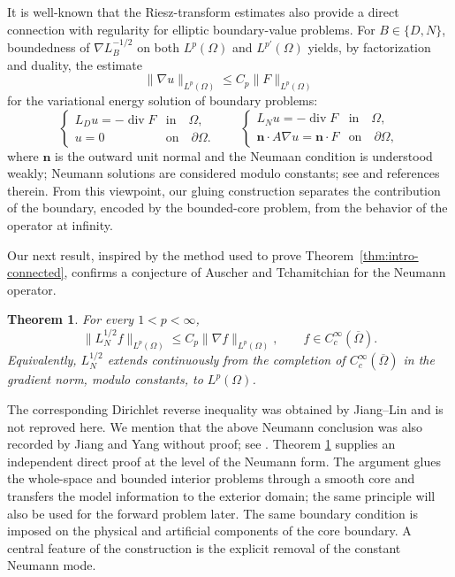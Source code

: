 \documentclass[12pt]{amsart}
\newcommand{\diver}{\operatorname{div}}
\newtheorem{theorem}{Theorem}[section]
\theoremstyle{remark}
\begin{document}
It is well-known that the Riesz-transform estimates also provide a direct connection with
regularity for elliptic boundary-value problems. For $B\in\{D,N\}$,
boundedness of $\nabla L_B^{-1/2}$ on both $L^p(\Omega)$ and
$L^{p'}(\Omega)$ yields, by factorization and duality, the estimate
\[
 \|\nabla u\|_{L^p(\Omega)}
 \leq C_p\|F\|_{L^p(\Omega)}
\]
for the variational energy solution of boundary problems:
\begin{equation*}
    \begin{cases}
        L_D u = - \diver F & \textrm{in} \quad \Omega,\\
        u = 0 & \textrm{on}\quad \partial \Omega.
    \end{cases} \qquad 
    \begin{cases}
        L_N u = - \diver F & \textrm{in} \quad \Omega,\\
        \mathbf n \cdot A \nabla u = \mathbf n \cdot F & \textrm{on}\quad \partial \Omega,
    \end{cases}
\end{equation*}
where $\mathbf n$ is the outward unit normal and the Neumaan condition
is understood weakly; Neumann solutions are considered modulo constants; see \cite{Byun05, Geng12} and references therein. From this viewpoint, our gluing construction separates the
contribution of the boundary, encoded by the bounded-core problem,
from the behavior of the operator at infinity.

Our next result, inspired by the method used to prove Theorem~\ref{thm:intro-connected}, confirms a conjecture of Auscher and Tchamitchian \cite[Remark 12]{AuscherTchamitchian01} for the Neumann operator.

\begin{theorem}
\label{thm:intro-neumann-reverse}
For every $1<p<\infty$,
\[
 \|L_N^{1/2}f\|_{L^p(\Omega)}
 \leq C_p\|\nabla f\|_{L^p(\Omega)},
 \qquad f\in C_c^\infty(\overline\Omega).
\]
Equivalently, $L_N^{1/2}$ extends continuously from the completion of
$C_c^\infty(\overline\Omega)$ in the gradient norm, modulo constants, to
$L^p(\Omega)$.
\end{theorem}

The corresponding Dirichlet reverse inequality was obtained by Jiang--Lin \cite[Theorem~1.3]{JiangLin24} and is not reproved here. We mention that the above Neumann conclusion was also recorded by Jiang and Yang without proof; see \cite[Remark~1.3]{JiangYang25}.  Theorem
\ref{thm:intro-neumann-reverse} supplies an independent direct proof at the
level of the Neumann form.  The argument glues the whole-space and bounded
interior problems through a smooth core and transfers the model information
to the exterior domain; the same principle will also be used for the forward
problem later.  The same boundary condition is imposed on the physical and
artificial components of the core boundary.  A central feature of the
construction is the explicit removal of the constant Neumann mode.  
\end{document}
